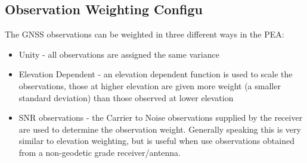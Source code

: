 \subsection{Observation Weighting Configu}
%
The GNSS observations can be weighted in three different ways in the PEA:
\begin{itemize}
    \item Unity - all observations are assigned the same variance
    \item Elevation Dependent - an elevation dependent function is used to scale the observations, those at higher elevation are given more weight (a smaller standard deviation) than those observed at lower elevation
    \item SNR observations - the Carrier to Noise observations supplied by the receiver are used to determine the observation weight. Generally speaking this is very similar to elevation weighting, but is useful when use observations obtained from a non-geodetic grade receiver/antenna.
\end{itemize}















